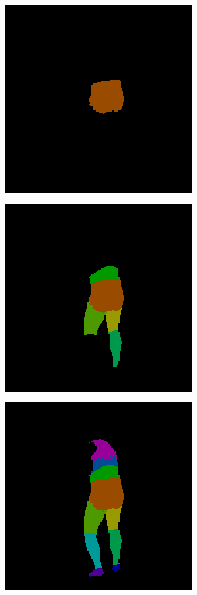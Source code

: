 \begin{figure}
\centering
\begin{subfigure}{.19\textwidth}
\centering
  \includegraphics[scale=0.3]{02_05_c0005_segm_80_2c.png}
\end{subfigure}
\begin{subfigure}{.19\textwidth}
  \centering
  \includegraphics[scale=0.3]{02_05_c0005_segm_80_6c.png}
\end{subfigure}
\begin{subfigure}{.19\textwidth}
  \centering
  \includegraphics[scale=0.3]{02_05_c0005_segm_80_12c.png}

\end{subfigure}
\end{figure}
